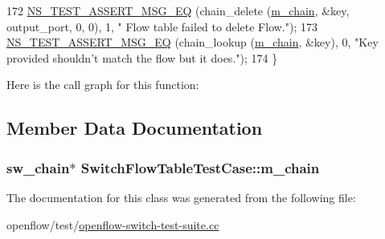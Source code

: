 \begin{DoxyCode}
172   \hyperlink{group__testing_ga2a9d78cffb3db8e867c35fff0b698cf5}{NS\_TEST\_ASSERT\_MSG\_EQ} (chain\_delete (\hyperlink{classSwitchFlowTableTestCase_a8f2e13cbf268c880500b1f2898b3558a}{m\_chain}, &key, output\_port, 0, 0), 1, \textcolor{stringliteral}{"
      Flow table failed to delete Flow."});
173   \hyperlink{group__testing_ga2a9d78cffb3db8e867c35fff0b698cf5}{NS\_TEST\_ASSERT\_MSG\_EQ} (chain\_lookup (\hyperlink{classSwitchFlowTableTestCase_a8f2e13cbf268c880500b1f2898b3558a}{m\_chain}, &key), 0, \textcolor{stringliteral}{"Key provided
       shouldn't match the flow but it does."});
174 \}
\end{DoxyCode}


Here is the call graph for this function\+:




\subsection{Member Data Documentation}
\subsubsection[{\texorpdfstring{m\+\_\+chain}{m_chain}}]{\setlength{\rightskip}{0pt plus 5cm}sw\+\_\+chain$\ast$ Switch\+Flow\+Table\+Test\+Case\+::m\+\_\+chain\hspace{0.3cm}{\ttfamily [private]}}\hypertarget{classSwitchFlowTableTestCase_a8f2e13cbf268c880500b1f2898b3558a}{}\label{classSwitchFlowTableTestCase_a8f2e13cbf268c880500b1f2898b3558a}


The documentation for this class was generated from the following file\+:\begin{DoxyCompactItemize}
\item 
openflow/test/\hyperlink{openflow-switch-test-suite_8cc}{openflow-\/switch-\/test-\/suite.\+cc}\end{DoxyCompactItemize}
